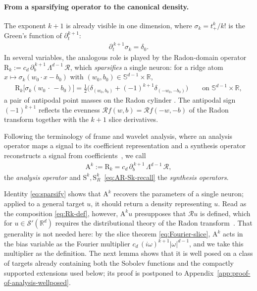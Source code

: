 \documentclass[12pt]{article}
\numberwithin{equation}{section}
\numberwithin{figure}{section}
\numberwithin{equation}{section}
\newcommand{\R}{\mathbb{R}}
\newcommand{\Sph}{\mathbb S}
\begin{document}
\paragraph{From a sparsifying operator to the canonical density.}
The exponent $k+1$ is already visible in one dimension, where $\sigma_k=t_+^k/k!$
is the Green's function of $\partial_t^{k+1}$:
\begin{align*}
    \partial_t^{\,k+1}\sigma_k=\delta_0.
\end{align*}
In several variables, the analogous role is played 
by the Radon-domain operator~\cite{parhi_banachspacerepresenter_2021}
$\mathrm{R}_k :=c_d\,\partial_b^{\,k+1}\,\Lambda^{d-1}\,\mathcal R$,
which \emph{sparsifies} a single neuron: for a ridge atom
$x\mapsto\sigma_k(w_0\cdot x-b_0)$ with $(w_0,b_0)\in\Sph^{d-1}\times\R$,
\begin{align}
    \mathrm{R}_k \big[\sigma_k(w_0\,\cdot\,-b_0)\big]
    =\tfrac12\Big(\delta_{(w_0,b_0)}+(-1)^{k+1}\delta_{(-w_0,-b_0)}\Big)
    \qquad\text{on }\Sph^{d-1}\times\R,
    \label{eq:sparsify}
\end{align}
a pair of antipodal point masses on the Radon cylinder
\cite{parhi_banachspacerepresenter_2021,parhi_whatkindsfunctions_2022}. The
antipodal sign $(-1)^{k+1}$ reflects the evenness
$\mathcal Rf(w,b)=\mathcal Rf(-w,-b)$ of the Radon transform together with the
$k+1$ slice derivatives.

Following the terminology of frame and wavelet analysis, where an analysis
operator maps a signal to its coefficient representation and a synthesis
operator reconstructs a signal from coefficients~\cite{christensen_IntroductionFramesRiesz_2016}, 
we call 
\begin{align}
    \mathrm A^k:=\mathrm{R}_k =c_d\,\partial_b^{\,k+1}\,\Lambda^{d-1}\,\mathcal R,
    \label{eq:Rk-def}
\end{align}
the \emph{analysis operator} and $\mathrm S^k,\mathrm S^k_R$~\eqref{eq:AR-Sk-recall}
the \emph{synthesis operators}.

Identity \eqref{eq:sparsify} shows that $\mathrm{A}^k$ recovers the parameters of a single
neuron; applied to a general target $u$, it should return a density representing $u$. Read
as the composition \eqref{eq:Rk-def}, however, $\mathrm{A}^k u$ presupposes that
$\mathcal Ru$ is defined, which for $u\in\mathcal S'(\mathbb R^d)$ requires the
distributional theory of the Radon
transform~\cite{parhi_distributionalextensioninvertibility_2024}. That generality is not
needed here: by the slice theorem \eqref{eq:Fourier-slice}, $\mathrm{A}^k$ acts in the
bias variable as the Fourier multiplier $c_d\,(i\omega)^{k+1}|\omega|^{d-1}$, and we take
this multiplier as the definition. The next lemma shows that it is well posed on a class of
targets already containing both the Sobolev functions and the compactly supported
extensions used below; its proof is postponed to
Appendix~\ref{app:proof-of-analysis-wellposed}.
\end{document}
